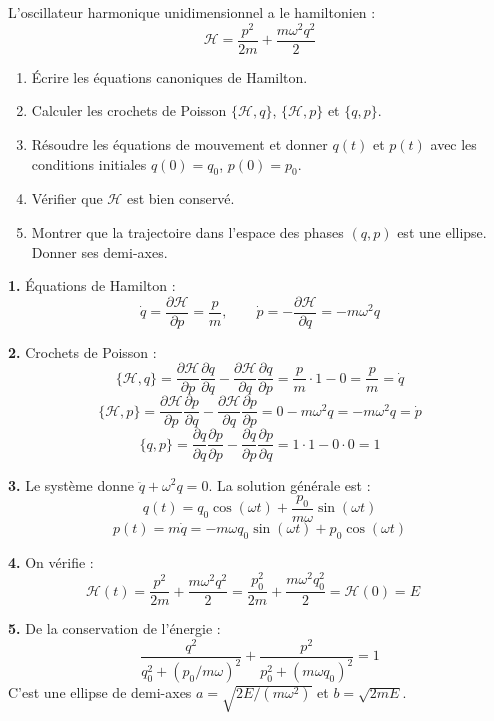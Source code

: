 \documentclass[12pt,a4paper]{article}
\begin{document}
\begin{boiteexercice}
L'oscillateur harmonique unidimensionnel a le hamiltonien :
\[
\mathcal{H} = \frac{p^2}{2m} + \frac{m\omega^2 q^2}{2}
\]
\begin{enumerate}
  \item Écrire les équations canoniques de Hamilton.
  \item Calculer les crochets de Poisson $\{\mathcal{H},q\}$, $\{\mathcal{H},p\}$ et $\{q,p\}$.
  \item Résoudre les équations de mouvement et donner $q(t)$ et $p(t)$ avec les conditions initiales $q(0)=q_0$, $p(0)=p_0$.
  \item Vérifier que $\mathcal{H}$ est bien conservé.
  \item Montrer que la trajectoire dans l'espace des phases $(q,p)$ est une ellipse. Donner ses demi-axes.
\end{enumerate}
\end{boiteexercice}

\begin{boitecorrige}
\textbf{1.} Équations de Hamilton :
\[
\dot q = \frac{\partial\mathcal{H}}{\partial p} = \frac{p}{m}, \qquad \dot p = -\frac{\partial\mathcal{H}}{\partial q} = -m\omega^2 q
\]

\textbf{2.} Crochets de Poisson :
\[
\{\mathcal{H},q\} = \frac{\partial\mathcal{H}}{\partial p}\frac{\partial q}{\partial q} - \frac{\partial\mathcal{H}}{\partial q}\frac{\partial q}{\partial p} = \frac{p}{m}\cdot 1 - 0 = \frac{p}{m} = \dot q
\]
\[
\{\mathcal{H},p\} = \frac{\partial\mathcal{H}}{\partial p}\frac{\partial p}{\partial q} - \frac{\partial\mathcal{H}}{\partial q}\frac{\partial p}{\partial p} = 0 - m\omega^2 q = -m\omega^2 q = \dot p
\]
\[
\{q,p\} = \frac{\partial q}{\partial q}\frac{\partial p}{\partial p} - \frac{\partial q}{\partial p}\frac{\partial p}{\partial q} = 1\cdot1 - 0\cdot0 = 1
\]

\textbf{3.} Le système donne $\ddot q + \omega^2 q = 0$. La solution générale est :
\[
q(t) = q_0\cos(\omega t) + \frac{p_0}{m\omega}\sin(\omega t)
\]
\[
p(t) = m\dot q = -m\omega q_0\sin(\omega t) + p_0\cos(\omega t)
\]

\textbf{4.} On vérifie :
\[
\mathcal{H}(t) = \frac{p^2}{2m}+\frac{m\omega^2 q^2}{2} = \frac{p_0^2}{2m}+\frac{m\omega^2 q_0^2}{2} = \mathcal{H}(0) = E\quad
\]

\textbf{5.} De la conservation de l'énergie :
\[
\frac{q^2}{q_0^2+(p_0/m\omega)^2} + \frac{p^2}{p_0^2+(m\omega q_0)^2} = 1
\]
C'est une ellipse de demi-axes $a = \sqrt{2E/(m\omega^2)}$ et $b = \sqrt{2mE}$.
\end{boitecorrige}
\end{document}
